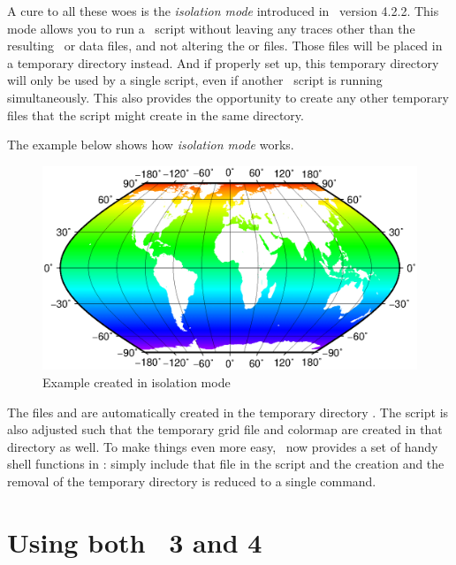 A cure to all these woes is the \emph{isolation mode} introduced in \GMT\ version 4.2.2. This mode allows you to run a \GMT\ script without leaving any traces other than the resulting \PS\  or data files, and not altering the  or  files. Those files will be placed in a temporary directory instead. And if properly set up, this temporary directory will only be used by a single script, even if another \GMT\ script is running simultaneously. This also provides the opportunity to create any other temporary files that the script might create in the same directory.

The example below shows how \emph{isolation mode} works.


\begin{figure}[h]
\centering
\includegraphics[width=\textwidth]{scripts/GMT_App_P_2}
\caption{Example created in isolation mode}
\label{fig:GMT_App_P_2}
\end{figure}

The files  and  are automatically created in the temporary directory . The script is also adjusted such that the temporary grid file  and colormap  are created in that directory as well. To make things even more easy, \GMT\ now provides a set of handy shell functions in : simply include that file in the script and the creation and the removal of the temporary directory is reduced to a single command.


\section{Using both \gmt\ 3 and 4}

